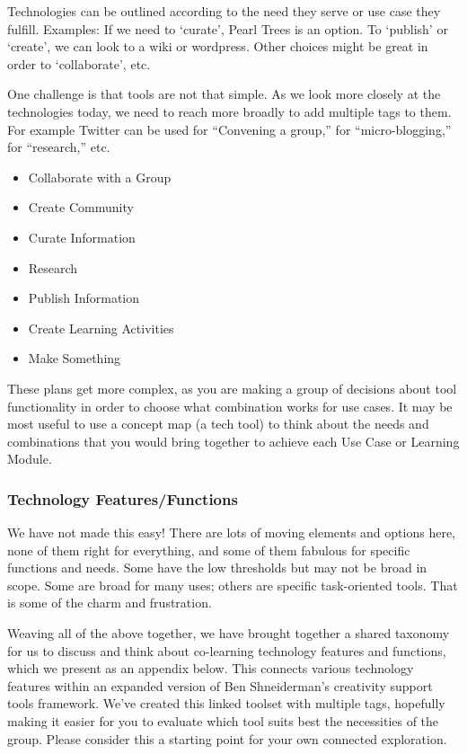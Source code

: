 Technologies can be outlined according to the need they serve or use
case they fulfill. Examples: If we need to `curate', Pearl Trees is an
option. To `publish' or `create', we can look to a wiki or wordpress.
Other choices might be great in order to `collaborate', etc.

One challenge is that tools are not that simple. As we look more closely
at the technologies today, we need to reach more broadly to add multiple
tags to them. For example Twitter can be used for ``Convening a group,''
for ``micro-blogging,'' for ``research,'' etc.

\begin{itemize}
\itemsep1pt\parskip0pt
\item
  Collaborate with a Group
\item
  Create Community
\item
  Curate Information 
\item
  Research
\item
  Publish Information
\item
  Create Learning Activities
\item
  Make Something
\end{itemize}

These plans get more complex, as you are making a group of decisions
about tool functionality in order to choose what combination works for
use cases. It may be most useful to use a concept map (a tech tool) to
think about the needs and combinations that you would bring together to
achieve each Use Case or Learning Module.

\subsubsection{Technology Features/Functions}

We have not made this easy! There are lots of moving elements and
options here, none of them right for everything, and some of them
fabulous for specific functions and needs. Some have the low thresholds
but may not be broad in scope. Some are broad for many uses; others are
specific task-oriented tools. That is some of the charm and frustration.

Weaving all of the above together, we have brought together a shared
taxonomy for us to discuss and think about co-learning technology
features and functions, which we present as an appendix below. This
connects various technology features within an expanded version of Ben
Shneiderman's creativity support tools framework. We've created this
linked toolset with multiple tags, hopefully making it easier for you to
evaluate which tool suits best the necessities of the group. Please
consider this a starting point for your own connected exploration.

